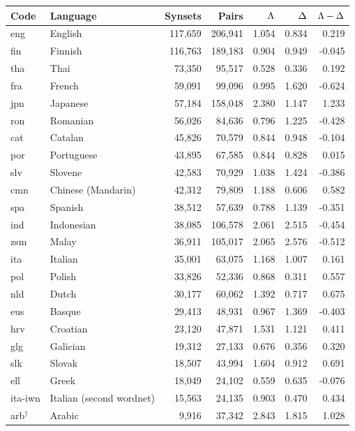 \begin{tabular}{@{}l l r r r r r@{}}
\toprule
Code & Language & Synsets & Pairs & $\Lambda$ & $\Delta$ & $\Lambda-\Delta$ \\
\midrule
eng & English & 117{,}659 & 206{,}941 & 1.054 & 0.834 & 0.219 \\
fin & Finnish & 116{,}763 & 189{,}183 & 0.904 & 0.949 & -0.045 \\
tha & Thai & 73{,}350 & 95{,}517 & 0.528 & 0.336 & 0.192 \\
fra & French & 59{,}091 & 99{,}096 & 0.995 & 1.620 & -0.624 \\
jpn & Japanese & 57{,}184 & 158{,}048 & 2.380 & 1.147 & 1.233 \\
ron & Romanian & 56{,}026 & 84{,}636 & 0.796 & 1.225 & -0.428 \\
cat & Catalan & 45{,}826 & 70{,}579 & 0.844 & 0.948 & -0.104 \\
por & Portuguese & 43{,}895 & 67{,}585 & 0.844 & 0.828 & 0.015 \\
slv & Slovene & 42{,}583 & 70{,}929 & 1.038 & 1.424 & -0.386 \\
cmn & Chinese (Mandarin) & 42{,}312 & 79{,}809 & 1.188 & 0.606 & 0.582 \\
spa & Spanish & 38{,}512 & 57{,}639 & 0.788 & 1.139 & -0.351 \\
ind & Indonesian & 38{,}085 & 106{,}578 & 2.061 & 2.515 & -0.454 \\
zsm & Malay & 36{,}911 & 105{,}017 & 2.065 & 2.576 & -0.512 \\
ita & Italian & 35{,}001 & 63{,}075 & 1.168 & 1.007 & 0.161 \\
pol & Polish & 33{,}826 & 52{,}336 & 0.868 & 0.311 & 0.557 \\
nld & Dutch & 30{,}177 & 60{,}062 & 1.392 & 0.717 & 0.675 \\
eus & Basque & 29{,}413 & 48{,}931 & 0.967 & 1.369 & -0.403 \\
hrv & Croatian & 23{,}120 & 47{,}871 & 1.531 & 1.121 & 0.411 \\
glg & Galician & 19{,}312 & 27{,}133 & 0.676 & 0.356 & 0.320 \\
slk & Slovak & 18{,}507 & 43{,}994 & 1.604 & 0.912 & 0.691 \\
ell & Greek & 18{,}049 & 24{,}102 & 0.559 & 0.635 & -0.076 \\
ita-iwn & Italian (second wordnet) & 15{,}563 & 24{,}135 & 0.903 & 0.470 & 0.434 \\
arb$^{\dagger}$ & Arabic & 9{,}916 & 37{,}342 & 2.843 & 1.815 & 1.028 \\

\end{tabular}
